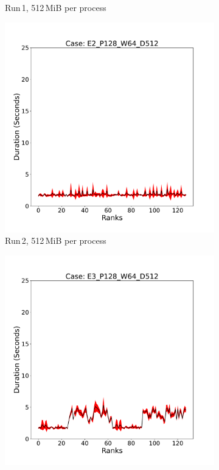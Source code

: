 \begin{figure}[h!]
\begin{subfigure}[b]{0.3\textwidth}
         \caption{Run\,1, 512\,MiB per process}
         \label{fig:E1_512_d11}
     \end{subfigure}
     \hfill
     \begin{subfigure}[b]{0.3\textwidth}
         \centering
         \includegraphics[width=\textwidth, height=\textwidth]{figures/deisa1__E2_P128_W64_D512.pdf}
         \caption{Run\,2, 512\,MiB per process}
         \label{fig:E2_512_d11}
     \end{subfigure}
      \hfill
     \begin{subfigure}[b]{0.3\textwidth}
         \centering
         \includegraphics[width=\textwidth, height=\textwidth]{figures/deisa1__E3_P128_W64_D512.pdf}

\end{subfigure}
\end{figure}
